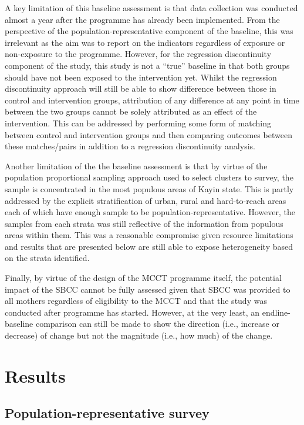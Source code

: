 \documentclass[12pt,a4paper]{article}
\begin{document}
A key limitation of this baseline assessment is that data collection was conducted almost a year after the programme has already been implemented. From the perspective of the population-representative component of the baseline, this was irrelevant as the aim was to report on the indicators regardless of exposure or non-exposure to the programme. However, for the regression discontinuity component of the study, this study is not a ``true'' baseline in that both groups should have not been exposed to the intervention yet. Whilst the regression discontinuity approach will still be able to show difference between those in control and intervention groups, attribution of any difference at any point in time between the two groups cannot be solely attributed as an effect of the intervention. This can be addressed by performing some form of matching between control and intervention groups and then comparing outcomes between these matches/pairs in addition to a regression discontinuity analysis.

Another limitation of the the baseline assessment is that by virtue of the population proportional sampling approach used to select clusters to survey, the sample is concentrated in the most populous areas of Kayin state. This is partly addressed by the explicit stratification of urban, rural and hard-to-reach areas each of which have enough sample to be population-representative. However, the samples from each strata was still reflective of the information from populous areas within them. This was a reasonable compromise given resource limitations and results that are presented below are still able to expose heterogeneity based on the strata identified.

Finally, by virtue of the design of the MCCT programme itself, the potential impact of the SBCC cannot be fully assessed given that SBCC was provided to all mothers regardless of eligibility to the MCCT and that the study was conducted after programme has started. However, at the very least, an endline-baseline comparison can still be made to show the direction (i.e., increase or decrease) of change but not the magnitude (i.e., how much) of the change.

\hypertarget{results}{%
\section{Results}\label{results}}

\hypertarget{study1-results}{%
\subsection{Population-representative survey}\label{study1-results}}
\end{document}
